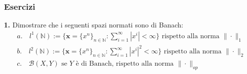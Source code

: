 \documentclass{article}
\numberwithin{equation}{subsection}
\begin{document}
\subsubsection{Esercizi}
\textbf{1.} Dimostrare che i seguenti spazi normati sono di Banach: \\
\begin{align*}
    &a. \quad l^1(\mathbb{N}) := \{\mathbf{x} = \{x^n\}_{n \in \mathbb{N}} : \sum_{i = 1}^\infty |x^i| < \infty\} \text{ rispetto alla norma }\|\cdot\|_1  \\
    &b. \quad l^2(\mathbb{N}) := \{\mathbf{x} = \{x^n\}_{n \in \mathbb{N}} : \sum_{i = 1}^\infty |x^i|^2 < \infty\} \text{ rispetto alla norma }\|\cdot\|_2  \\
    &c. \quad \mathcal{B}(X, Y) \text{ se } Y \text{ è di Banach, rispetto alla norma } \|\cdot\|_{op} 
\end{align*} \\
\end{document}
